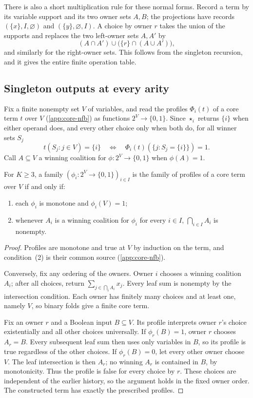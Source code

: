 There is also a short multiplication rule for these normal forms.
Record a term by its variable support and its two owner sets $A,B$;
the projections have records $(\{x\},I,\varnothing)$ and
$(\{y\},\varnothing,I)$. A choice by owner $r$ takes the union
of the supports and replaces the two left-owner sets $A,A'$ by
\[
 (A\cap A')\cup\bigl(\{r\}\cap(A\cup A')\bigr),
\]
and similarly for the right-owner sets. This follows from the
singleton recursion, and it gives the entire finite operation table.

\subsection{Singleton outputs at every arity}
\label{app:core-profiles}

Fix a finite nonempty set $V$ of variables, and read the profiles
$\Phi_i(t)$ of a core term $t$ over $V$ (\cref{app:core-nfb}) as
functions $2^V\to\{0,1\}$. Since $\star_i$ returns $\{i\}$ when either
operand does, and every other choice only when both do, for all winner
sets $S_j$
\[
 t(S_j:j\in V)=\{i\}
 \quad\Longleftrightarrow\quad
 \Phi_i(t)(\{j:S_j=\{i\}\})=1.
\]
Call $A\subseteq V$ a winning coalition for $\phi:2^V\to\{0,1\}$ when
$\phi(A)=1$.

\begin{theorem}\label{core:thm:profiles}
For $K\geq3$, a family $(\phi_i:2^V\to\{0,1\})_{i\in I}$ is the
family of profiles of a core term over $V$ if and only if:
\begin{enumerate}
\item each $\phi_i$ is monotone and $\phi_i(V)=1$;
\item whenever $A_i$ is a winning coalition for $\phi_i$ for every
  $i\in I$, $\bigcap_{i\in I}A_i$ is nonempty.
\end{enumerate}
\end{theorem}
\begin{proof}
Profiles are monotone and true at $V$ by induction on the term, and
condition~(2) is their common source (\cref{app:core-nfb}).

Conversely, fix any ordering of the owners. Owner $i$ chooses a winning
coalition $A_i$; after all choices, return
$\sum_{j\in\bigcap_i A_i}x_j$. Every leaf sum is nonempty by the
intersection condition. Each owner has finitely many choices and at least
one, namely $V$, so binary folds give a finite core term.

Fix an owner $r$ and a Boolean input $B\subseteq V$. Its profile
interprets owner $r$'s choice existentially and all other choices
universally. If $\phi_r(B)=1$, owner $r$ chooses $A_r=B$.
Every subsequent leaf sum then uses only variables in $B$, so its
profile is true regardless of the other choices. If $\phi_r(B)=0$,
let every other owner choose $V$. The leaf intersection is then $A_r$;
no winning $A_r$ is contained in $B$, by monotonicity. Thus the
profile is false for every choice by $r$. These choices are independent
of the earlier history, so the argument holds in the fixed owner order.
The constructed term has exactly the prescribed profiles.
\end{proof}


